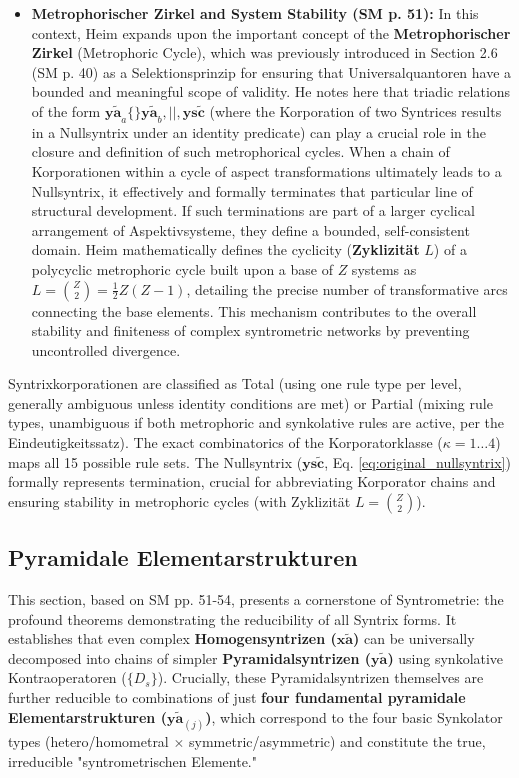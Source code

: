 \documentclass[12pt]{article}
\newcommand{\syntrix}{\bm{y\widetilde{a}}}
\newcommand{\homogeneoussyntrix}{\bm{x\widetilde{a}}}
\newcommand{\nullsyntrix}{\bm{ys\widetilde{c}}}
\newcommand{\elementarstruktur}{\bm{y\widetilde{a}}_{(j)}}
\begin{document}
\begin{itemize}
    \item \textbf{Metrophorischer Zirkel and System Stability (SM p. 51):}
    In this context, Heim expands upon the important concept of the \textbf{Metrophorischer Zirkel} (Metrophoric Cycle), which was previously introduced in Section 2.6 (SM p. 40) as a Selektionsprinzip for ensuring that Universalquantoren have a bounded and meaningful scope of validity. He notes here that triadic relations of the form \( \syntrix_a \{\} \syntrix_b, ||, \nullsyntrix \) (where the Korporation of two Syntrices results in a Nullsyntrix under an identity predicate) can play a crucial role in the closure and definition of such metrophorical cycles. When a chain of Korporationen within a cycle of aspect transformations ultimately leads to a Nullsyntrix, it effectively and formally terminates that particular line of structural development. If such terminations are part of a larger cyclical arrangement of Aspektivsysteme, they define a bounded, self-consistent domain. Heim mathematically defines the cyclicity (\textbf{Zyklizität} \( L \)) of a polycyclic metrophoric cycle built upon a base of \(Z\) systems as \( L = \binom{Z}{2} = \frac{1}{2}Z(Z-1) \), detailing the precise number of transformative arcs connecting the base elements. This mechanism contributes to the overall stability and finiteness of complex syntrometric networks by preventing uncontrolled divergence.
\end{itemize}

Syntrixkorporationen are classified as Total (using one rule type per level, generally ambiguous unless identity conditions are met) or Partial (mixing rule types, unambiguous if both metrophoric and synkolative rules are active, per the Eindeutigkeitssatz). The exact combinatorics of the Korporatorklasse (\(\kappa=1 \dots 4\)) maps all 15 possible rule sets. The Nullsyntrix (\(\nullsyntrix\), Eq. \eqref{eq:original_nullsyntrix}) formally represents termination, crucial for abbreviating Korporator chains and ensuring stability in metrophoric cycles (with Zyklizität \( L = \binom{Z}{2} \)).

\subsection{Pyramidale Elementarstrukturen}
\label{sec:elementarstrukturen}

This section, based on SM pp. 51-54, presents a cornerstone of Syntrometrie: the profound theorems demonstrating the reducibility of all Syntrix forms. It establishes that even complex \textbf{Homogensyntrizen (\(\homogeneoussyntrix\))} can be universally decomposed into chains of simpler \textbf{Pyramidalsyntrizen (\(\syntrix\))} using synkolative Kontraoperatoren (\(\{D_s\}\)). Crucially, these Pyramidalsyntrizen themselves are further reducible to combinations of just \textbf{four fundamental pyramidale Elementarstrukturen (\(\elementarstruktur\))}, which correspond to the four basic Synkolator types (hetero/homometral \( \times \) symmetric/asymmetric) and constitute the true, irreducible "syntrometrischen Elemente."
\end{document}
